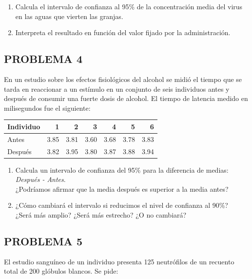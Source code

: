 \documentclass[
]{article}
\providecommand{\tightlist}{%
  \setlength{\itemsep}{0pt}\setlength{\parskip}{0pt}}
\begin{document}
\begin{enumerate}
\def\labelenumi{\alph{enumi})}
\tightlist
\item
  Calcula el intervalo de confianza al 95\% de la concentración media del virus en las aguas que vierten las granjas.\\
\item
  Interpreta el resultado en función del valor fijado por la administración.
\end{enumerate}

\subsection{PROBLEMA 4}\label{problema-4-1}

En un estudio sobre los efectos fisiológicos del alcohol se midió el tiempo que se tarda en reaccionar a un estímulo en un conjunto de seis individuos antes y después de consumir una fuerte dosis de alcohol. El tiempo de latencia medido en milisegundos fue el siguiente:

\begin{longtable}[]{@{}lrrrrrr@{}}
\toprule\noalign{}
Individuo & 1 & 2 & 3 & 4 & 5 & 6 \\
\midrule\noalign{}
\endhead
\bottomrule\noalign{}
\endlastfoot
Antes & 3.85 & 3.81 & 3.60 & 3.68 & 3.78 & 3.83 \\
Después & 3.82 & 3.95 & 3.80 & 3.87 & 3.88 & 3.94 \\
\end{longtable}

\begin{enumerate}
\def\labelenumi{\alph{enumi})}
\item
  Calcula un intervalo de confianza del 95\% para la diferencia de medias: \emph{Después - Antes}.\\
  ¿Podríamos afirmar que la media después es superior a la media antes?
\item
  ¿Cómo cambiará el intervalo si reducimos el nivel de confianza al 90\%?\\
  ¿Será más amplio? ¿Será más estrecho? ¿O no cambiará?
\end{enumerate}

\subsection{PROBLEMA 5}\label{problema-5-1}

El estudio sanguíneo de un individuo presenta 125 neutrófilos de un recuento total de 200 glóbulos blancos. Se pide:
\end{document}
